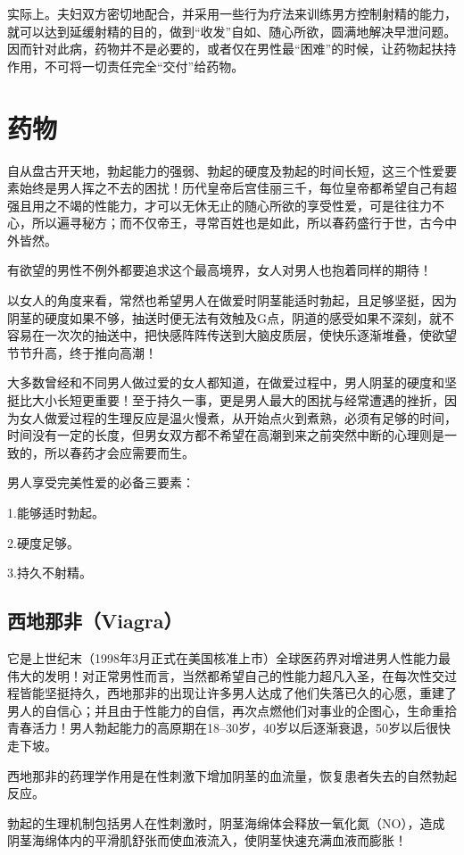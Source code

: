 \documentclass[12pt,UTF8]{ctexbook}
\begin{document}
实际上。夫妇双方密切地配合，并采用一些行为疗法来训练男方控制射精的能力，就可以达到延缓射精的目的，做到“收发”自如、随心所欲，圆满地解决早泄问题。因而针对此病，药物并不是必要的，或者仅在男性最“困难”的时候，让药物起扶持作用，不可将一切责任完全“交付”给药物。

\chapter{药物}

自从盘古开天地，勃起能力的强弱、勃起的硬度及勃起的时间长短，这三个性爱要素始终是男人挥之不去的困扰！历代皇帝后宫佳丽三千，每位皇帝都希望自己有超强且用之不竭的性能力，才可以无休无止的随心所欲的享受性爱，可是往往力不心，所以遍寻秘方；而不仅帝王，寻常百姓也是如此，所以春药盛行于世，古今中外皆然。

有欲望的男性不例外都要追求这个最高境界，女人对男人也抱着同样的期待！

以女人的角度来看，常然也希望男人在做爱时阴茎能适时勃起，且足够坚挺，因为阴茎的硬度如果不够，抽送时便无法有效触及G点，阴道的感受如果不深刻，就不容易在一次次的抽送中，把快感阵阵传送到大脑皮质层，使快乐逐渐堆叠，使欲望节节升高，终于推向高潮！

大多数曾经和不同男人做过爱的女人都知道，在做爱过程中，男人阴茎的硬度和坚挺比大小长短更重要！至于持久一事，更是男人最大的困扰与经常遭遇的挫折，因为女人做爱过程的生理反应是温火慢煮，从开始点火到煮熟，必须有足够的时间，时间没有一定的长度，但男女双方都不希望在高潮到来之前突然中断的心理则是一致的，所以春药才会应需要而生。

男人享受完美性爱的必备三要素：

1.能够适时勃起。

2.硬度足够。

3.持久不射精。

\section{西地那非（Viagra）}

它是上世纪末（1998年3月正式在美国核准上市）全球医药界对增进男人性能力最伟大的发明！对正常男性而言，当然都希望自己的性能力超凡入圣，在每次性交过程皆能坚挺持久，西地那非的出现让许多男人达成了他们失落已久的心愿，重建了男人的自信心；并且由于性能力的自信，再次点燃他们对事业的企图心，生命重拾青春活力！男人勃起能力的高原期在18--30岁，40岁以后逐渐衰退，50岁以后很快走下坡。

西地那非的药理学作用是在性刺激下增加阴茎的血流量，恢复患者失去的自然勃起反应。

勃起的生理机制包括男人在性刺激时，阴茎海绵体会释放一氧化氮（NO），造成阴茎海绵体内的平滑肌舒张而使血液流入，使阴茎快速充满血液而膨胀！
\end{document}
